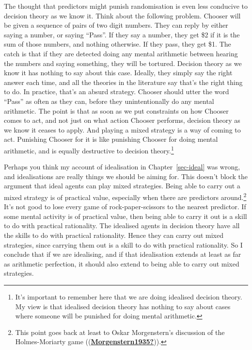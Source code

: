 \documentclass[
  12pt,
  letterpaper,
  DIV=11,
  numbers=noendperiod]{scrreprt}
\begin{document}
The thought that predictors might punish randomisation is even less
conducive to decision theory as we know it. Think about the following
problem. Chooser will be given a sequence of pairs of two digit numbers.
They can reply by either saying a number, or saying ``Pass''. If they
say a number, they get \$2 if it is the sum of those numbers, and
nothing otherwise. If they pass, they get \$1. The catch is that if they
are detected doing any mental arithmetic between hearing the numbers and
saying something, they will be tortured. Decision theory as we know it
has nothing to say about this case. Ideally, they simply say the right
answer each time, and all the theories in the literature say that's the
right thing to do. In practice, that's an absurd strategy. Chooser
should utter the word ``Pass'' as often as they can, before they
unintentionally do any mental arithmetic. The point is that as soon as
we put constraints on how Chooser comes to act, and not just on what
action Chooser performs, decision theory as we know it ceases to apply.
And playing a mixed strategy is a way of coming to act. Punishing
Chooser for it is like punishing Chooser for doing mental arithmetic,
and is equally destructive to decision theory.\footnote{It's important
  to remember here that we are doing idealised decision theory. My view
  is that idealised decision theory has nothing to say about cases where
  someone will be punished for doing mental arithmetic.}

Perhaps you think my account of idealisation in Chapter~\ref{sec-ideal}
was wrong, and idealisations are really things we should be aiming for.
This doesn't block the argument that ideal agents can play mixed
strategies. Being able to carry out a mixed strategy is of practical
value, especially when there are predictors around.\footnote{This point
  goes back at least to Oskar Morgenstern's discussion of the
  Holmes-Moriarty game
  ((\protect\hyperlink{ref-Morgenstern1935}{\textbf{Morgenstern1935?}})).}
It's not good to lose every game of rock-paper-scissors to the nearest
predictor. If some mental activity is of practical value, then being
able to carry it out is a skill to do with practical rationality. The
idealised agents in decision theory have all the skills to do with
practical rationality. Hence they can carry out mixed strategies, since
carrying them out is a skill to do with practical rationality. So I
conclude that if we are idealising, and if that idealisation extends at
least as far as arithmetic perfection, it should also extend to being
able to carry out mixed strategies.
\end{document}
